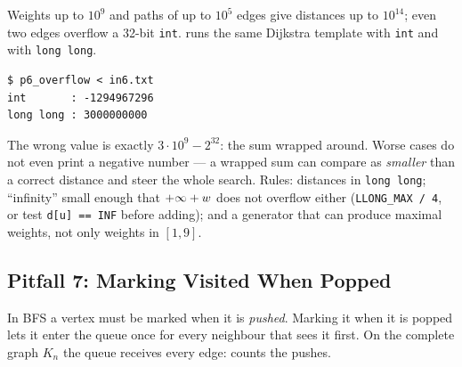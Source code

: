Weights up to $10^9$ and paths of up to $10^5$ edges give distances up to $10^{14}$; even two edges overflow a 32-bit \texttt{int}.  runs the same Dijkstra template with \texttt{int} and with \texttt{long long}.

\begin{diagrambox}
\end{diagrambox}

\begin{lstlisting}[style=trace]
$ p6_overflow < in6.txt
int       : -1294967296
long long : 3000000000
\end{lstlisting}

The wrong value is exactly $3\cdot10^9 - 2^{32}$: the sum wrapped around. Worse cases do not even print a negative number --- a wrapped sum can compare as \emph{smaller} than a correct distance and steer the whole search. Rules: distances in \texttt{long long}; ``infinity'' small enough that $+\infty + w$ does not overflow either (\texttt{LLONG\_MAX / 4}, or test \texttt{d[u] == INF} before adding); and a generator that can produce maximal weights, not only weights in $[1,9]$.

\subsection{Pitfall 7: Marking Visited When Popped}
\label{ssec:ts-p7}

In BFS a vertex must be marked when it is \emph{pushed}. Marking it when it is popped lets it enter the queue once for every neighbour that sees it first. On the complete graph $K_n$ the queue receives every edge:  counts the pushes.

